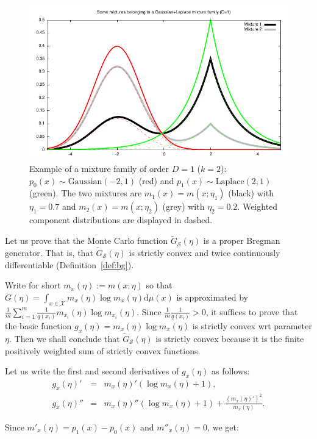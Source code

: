 \documentclass[graybox]{svmult}
\def\dmu{\mathrm{d}\mu}
\def\eqdef{:=}
\def\tildeG{\tilde{G}}
\def\calS{\mathcal{S}}
\def\calX{\mathcal{X}}
\begin{document}
\begin{figure}%
\centering
\includegraphics[width=0.85\columnwidth]{wLaplaceGaussian.pdf}%

\caption{Example of a mixture family of order $D=1$ ($k=2$): $p_0(x)\sim \mathrm{Gaussian}(-2,1)$ (red) and $p_1(x)\sim \mathrm{Laplace}(2,1)$ (green). 
The two mixtures are $m_1(x)=m(x;\eta_1)$ (black) with $\eta_1=0.7$ and $m_2(x)=m(x;\eta_2)$ (grey) with $\eta_2=0.2$. Weighted component distributions  are displayed in dashed.
 }%
\label{fig:mmexample}%
\end{figure}

 
Let us prove that the Monte Carlo function $\tildeG_\calS(\eta)$ is a proper Bregman generator.
That is, that  $\tildeG_\calS(\eta)$ is strictly convex and twice continuously differentiable (Definition~\ref{def:bg}).

Write for short $m_x(\eta) \eqdef m(x;\eta)$ so that $G(\eta)=\int_{x\in\calX} m_x(\eta)\log m_x(\eta)\dmu(x)$ is 
approximated by  $\frac{1}{m} \sum_{i=1}^m  \frac{1}{q(x_i)} m_{x_i}(\eta)\log m_{x_i}(\eta)$.
Since $\frac{1}{m} \frac{1}{q(x_i)}>0$, it suffices to prove that the  basic function $g_x(\eta)=m_{x}(\eta)\log m_{x}(\eta)$ is strictly convex wrt parameter $\eta$.
Then we shall conclude that $\tildeG_\calS(\eta)$ is strictly convex because it is the  finite positively weighted sum of strictly convex functions.

Let us write the first and second derivatives of $g_x(\eta)$ as follows:
\begin{eqnarray}
g_x(\eta)' &=&m_{x}(\eta)'(\log m_{x}(\eta)+1),\\
g_x(\eta)'' &=& m_{x}(\eta)''(\log m_{x}(\eta)+1)+\frac{(m_{x}(\eta)')^2}{m_{x}(\eta)}.
\end{eqnarray}

Since $m'_x(\eta)=p_1(x)-p_0(x)$ and $m''_x(\eta)=0$, we get:
\end{document}
